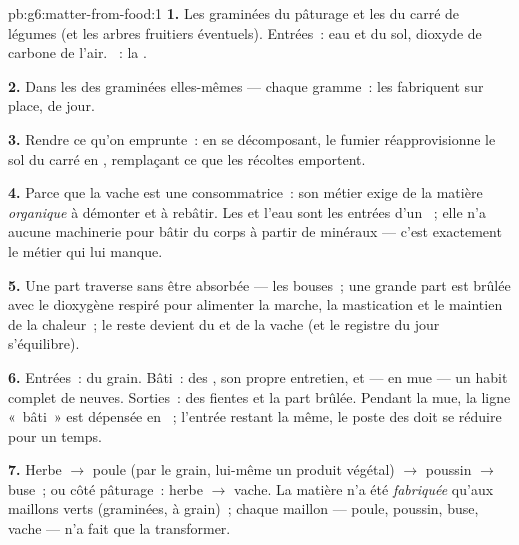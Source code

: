 \begin{solution}{pb:g6:matter-from-food:1}
\textbf{1.} Les graminées du pâturage et les  du carré de
légumes (et les arbres fruitiers éventuels). Entrées~: eau et  du sol, dioxyde de carbone de l'air. ~: la .

\textbf{2.} Dans les  des graminées elles-mêmes --- chaque
gramme~: les  fabriquent sur place, de jour.

\textbf{3.} Rendre ce qu'on emprunte~: en se décomposant, le fumier
réapprovisionne le sol du carré en , remplaçant ce que
les récoltes emportent.

\textbf{4.} Parce que la vache est une consommatrice~: son métier
exige de la matière \emph{organique} à démonter et à rebâtir. Les
 et l'eau sont les entrées d'un ~; elle n'a
aucune machinerie pour bâtir du corps à partir de minéraux --- c'est
exactement le métier qui lui manque.

\textbf{5.} Une part traverse sans être absorbée --- les bouses~;
une grande part est brûlée avec le dioxygène respiré pour alimenter
la marche, la mastication et le maintien de la chaleur~; le reste
devient du  et de la vache (et le registre du jour s'équilibre).

\textbf{6.} Entrées~: du grain. Bâti~: des , son propre
entretien, et --- en mue --- un habit complet de  neuves.
Sorties~: des fientes et la part brûlée. Pendant la mue, la ligne
«~bâti~» est dépensée en ~; l'entrée restant la même, le poste
des  doit se réduire pour un temps.

\textbf{7.} Herbe $\rightarrow$ poule (par le grain, lui-même un
produit végétal) $\rightarrow$ poussin $\rightarrow$ buse~; ou côté
pâturage~: herbe $\rightarrow$ vache. La matière n'a été
\emph{fabriquée} qu'aux maillons verts (graminées,  à
grain)~; chaque maillon  --- poule, poussin, buse, vache ---
n'a fait que la transformer.


\end{solution}
